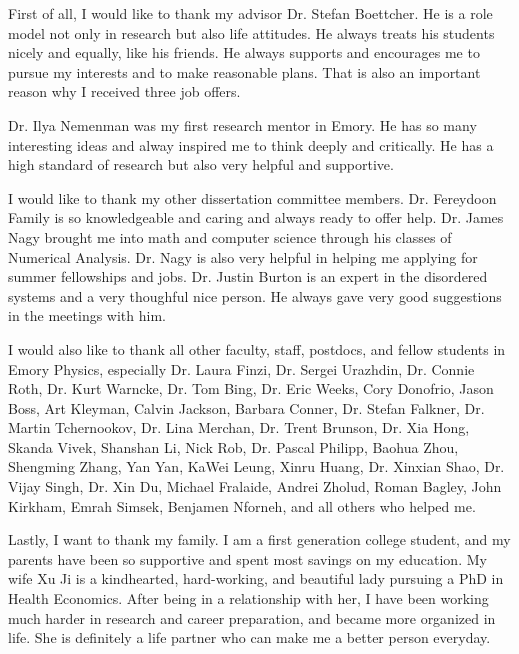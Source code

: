 \makecovertwo

\begin{acknowledgements}
First of all, I would like to thank my advisor Dr. Stefan Boettcher. He is a role model not only in research but also life attitudes. He always treats his students nicely and equally, like his friends. He always supports and encourages me to pursue my interests and to make reasonable plans. That is also an important reason why I received three job offers.  

Dr. Ilya Nemenman was my first research mentor in Emory. He has so many interesting ideas and alway inspired me to think deeply and critically. He has a high standard of research but also very helpful and supportive.

I would like to thank my other dissertation committee members. Dr. Fereydoon Family is so knowledgeable and caring and always ready to offer help. Dr. James Nagy brought me into math and computer science through his classes of Numerical Analysis. Dr. Nagy is also very helpful in helping me applying for summer fellowships and jobs.  Dr. Justin Burton is an expert in the disordered systems and a very thoughful nice person. He always gave very good suggestions in the meetings with him.  

I would also like to thank all other faculty, staff, postdocs, and fellow students in Emory Physics, especially Dr. Laura Finzi, Dr. Sergei Urazhdin, Dr. Connie Roth, Dr. Kurt Warncke, Dr. Tom Bing, Dr. Eric Weeks, Cory Donofrio, Jason Boss, Art Kleyman, Calvin Jackson, Barbara Conner, Dr. Stefan Falkner, Dr. Martin Tchernookov, Dr. Lina Merchan, Dr. Trent Brunson, Dr. Xia Hong, Skanda Vivek, Shanshan Li, Nick Rob, Dr. Pascal Philipp, Baohua Zhou, Shengming Zhang, Yan Yan, KaWei Leung, Xinru Huang, Dr. Xinxian Shao, Dr. Vijay Singh, Dr. Xin Du, Michael Fralaide, Andrei Zholud, Roman Bagley, John Kirkham, Emrah Simsek, Benjamen Nforneh, and all others who helped me.

Lastly, I want to thank my family. I am a first generation college student, and my parents have been so supportive and spent most savings on my education. My wife Xu Ji is a kindhearted, hard-working, and beautiful lady pursuing a PhD in Health Economics. After being in a relationship with her, I have been working much harder in research and career preparation, and became more organized in life. She is definitely a life partner who can make me a better person everyday.



\end{acknowledgements}
\thesistableofcontents
\thesislistoftables
\thesislistoffigures

